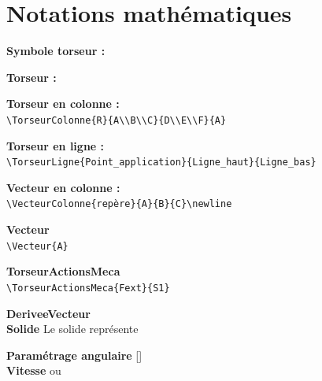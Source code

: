 \documentclass[b,e,cours]{D:/hubiC/GitHub/test_Baggio/paquets/classe_kara}
\begin{document}
\section{Notations mathématiques}
\begin{frame}
\textbf{Symbole torseur :}\\
\SymboleTorseur

\textbf{Torseur :}\\
 

\textbf{Torseur en colonne :}\\
\newline
\verb$\TorseurColonne{R}{A\\B\\C}{D\\E\\F}{A}$

\textbf{Torseur en ligne :}\\
\newline
\verb$\TorseurLigne{Point_application}{Ligne_haut}{Ligne_bas}$

\textbf{Vecteur en colonne :}\\
\newline
\verb$\VecteurColonne{repère}{A}{B}{C}\newline$

\textbf{Vecteur}\\
\newline
\verb$\Vecteur{A}$

\textbf{TorseurActionsMeca}\\
\newline
\verb$\TorseurActionsMeca{Fext}{S1}$

\textbf{DeriveeVecteur}\\

\textbf{Solide}
Le solide  représente

\textbf{Paramétrage angulaire}\newline
{}[]\\

\textbf{Vitesse}\newline
{} ou \\


\end{frame}
\end{document}
